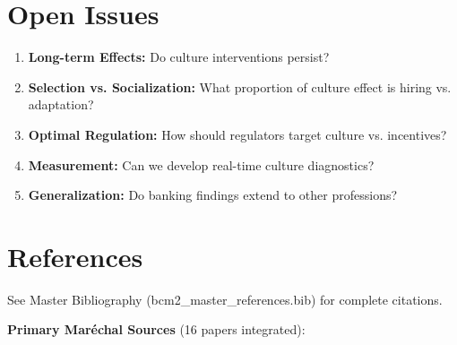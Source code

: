 \section{Open Issues}

\begin{enumerate}
    \item \textbf{Long-term Effects:} Do culture interventions persist?
    \item \textbf{Selection vs. Socialization:} What proportion of culture effect is hiring vs. adaptation?
    \item \textbf{Optimal Regulation:} How should regulators target culture vs. incentives?
    \item \textbf{Measurement:} Can we develop real-time culture diagnostics?
    \item \textbf{Generalization:} Do banking findings extend to other professions?
\end{enumerate}

\section{References}

See Master Bibliography (bcm2\_master\_references.bib) for complete citations.

\nocite{bcm_master}

\textbf{Primary Maréchal Sources} (16 papers integrated):

